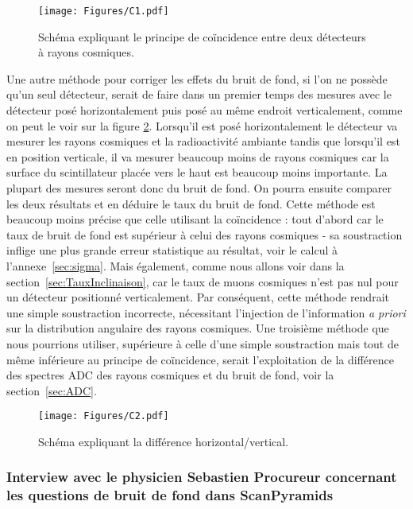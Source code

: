\documentclass[a4paper, 12pt]{article}
\begin{document}
\begin{spacing}{1.5}
\begin{figure}[t]
\begin{center}
\texttt{[image: Figures/C1.pdf]}
\caption{\label{fig:coincidence} Schéma expliquant le principe de coïncidence entre deux détecteurs à rayons cosmiques.}
\end{center}
\end{figure}

Une autre méthode pour corriger les effets du bruit de fond, si l'on ne possède qu’un seul détecteur, serait de faire dans un premier temps des mesures avec le détecteur posé horizontalement puis posé au même endroit verticalement, comme on peut le voir sur la figure \ref{fig:hor.ver}. Lorsqu'il est posé horizontalement le détecteur va mesurer les rayons cosmiques et la radioactivité ambiante tandis que lorsqu'il est en position verticale, il va mesurer beaucoup moins de rayons cosmiques car la surface du scintillateur placée vers le haut est beaucoup moins importante. La plupart des mesures seront donc du bruit de fond. On pourra ensuite comparer les deux résultats et en déduire le taux du bruit de fond. Cette méthode est beaucoup moins précise que celle utilisant la coïncidence : tout d'abord car le taux de bruit de fond est supérieur à celui des rayons cosmiques - sa soustraction inflige une plus grande erreur statistique au résultat, voir le calcul à l'annexe~\ref{sec:sigma}. Mais également, comme nous allons voir dans la section~\ref{sec:TauxInclinaison}, car le taux de muons cosmiques n'est pas nul pour un détecteur positionné verticalement. Par conséquent, cette méthode rendrait une simple soustraction incorrecte, nécessitant l'injection de l'information \emph{a priori} sur la distribution angulaire des rayons cosmiques. Une troisième méthode que nous pourrions utiliser, supérieure à celle d'une simple soustraction mais tout de même inférieure au principe de coïncidence, serait l'exploitation de la différence des spectres ADC des rayons cosmiques et du bruit de fond, voir la section~\ref{sec:ADC}.

\begin{figure}[t]
\begin{center}
\texttt{[image: Figures/C2.pdf]}
\caption{\label{fig:hor.ver} Schéma expliquant la différence horizontal/vertical.}
\end{center}
\end{figure}

\subsubsection{Interview avec le physicien Sebastien Procureur concernant les questions de bruit de fond dans ScanPyramids}


\end{spacing}
\end{document}

